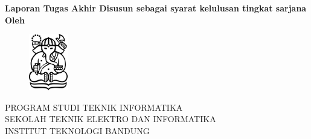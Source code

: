 \clearpage
\pagestyle{empty}

\begin{center}
\smallskip
    \Large \bfseries \MakeUppercase{\thetitle}
    \vfill
    \Large Laporan Tugas Akhir
    \vfill
    \large Disusun sebagai syarat kelulusan tingkat sarjana
    \vfill
    \large Oleh
    \Large \theauthor
    \vfill
    \begin{figure}[h]
        \centering
      	\includegraphics[width=0.15\textwidth]{images/itb-logo}
    \end{figure}
    \vfill
    \large
    \uppercase{
        Program Studi Teknik Informatika \\
        Sekolah Teknik Elektro dan Informatika \\
        Institut Teknologi Bandung
    }

    \thedate
\end{center}
\clearpage
